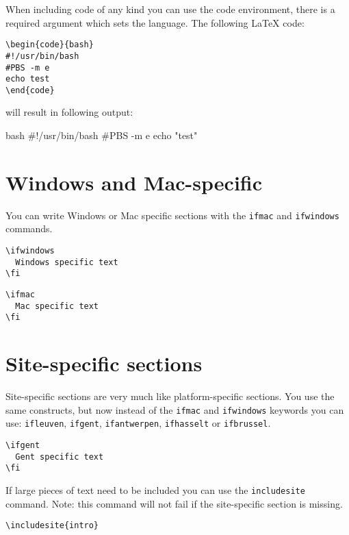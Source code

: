 \documentclass[11pt,a4paper]{article}
\begin{document}
When including code of any kind you can use the code environment, there is a
required argument which sets the language. The following LaTeX code:

\begin{verbatim}
\begin{code}{bash}
#!/usr/bin/bash
#PBS -m e
echo test
\end{code}
\end{verbatim}

will result in following output:

\begin{code}{bash}
#!/usr/bin/bash
#PBS -m e
echo "test"
\end{code}

\section{Windows and Mac-specific}
\label{sec:windows-and-mac-specific}

You can write Windows or Mac specific sections with the \texttt{ifmac} and
\texttt{ifwindows} commands.

\begin{verbatim}
\ifwindows
  Windows specific text
\fi
\end{verbatim}

\begin{verbatim}
\ifmac
  Mac specific text
\fi
\end{verbatim}


\section{Site-specific sections}
\label{sec:site-specific-sections}

Site-specific sections are very much like platform-specific sections. You use
the same constructs, but now instead of the \texttt{ifmac} and \texttt{ifwindows}
keywords you can use: \texttt{ifleuven}, \texttt{ifgent}, \texttt{ifantwerpen},
\texttt{ifhasselt} or \texttt{ifbrussel}.

\begin{verbatim}
\ifgent
  Gent specific text
\fi
\end{verbatim}

If large pieces of text need to be included you can use the
\verb|includesite| command.
Note: this command will not fail if the site-specific section is missing.

\begin{verbatim}
\includesite{intro}
\end{verbatim}
\end{document}

